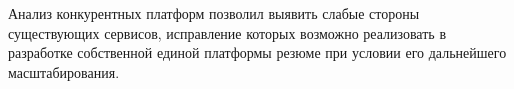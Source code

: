 \documentclass[master, och, pract]{SCWorks}
\begin{document}
Анализ конкурентных платформ позволил выявить слабые стороны существующих сервисов, 
исправление которых возможно реализовать в разработке собственной единой платформы 
резюме при условии его дальнейшего масштабирования. \cite{Arhipov_2015}




%








\appendix
\end{document}
